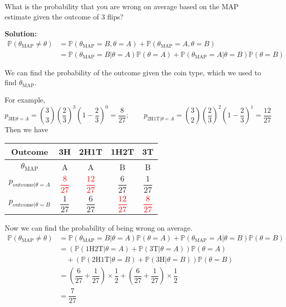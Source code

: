 \newpage
\begin{eg}
  What is the probability that you are wrong on average based on the MAP estimate given the outcome of 3 flips? 

  \textbf{Solution:} 
  \[
    \begin{aligned}
      \mathbb{P}(\theta_{\text{MAP}} \neq \theta) &= \mathbb{P}(\theta_{\text{MAP}} = B, \theta = A) + \mathbb{P}(\theta_{\text{MAP}} = A, \theta = B) \\
      &= \mathbb{P}(\theta_{\text{MAP}} = B \vert \theta = A) \mathbb{P}(\theta = A) + \mathbb{P}(\theta_{\text{MAP}} = A \vert \theta = B) \mathbb{P}(\theta = B)
    \end{aligned}
  \]

  We can find the probability of the outcome given the coin type, which we used to find \(\theta_{\text{MAP}}\). 

  For example,
  \[
    p_{\text{3H} \vert \theta = A} = \binom{3}{3} (\frac{2}{3})^3 (1 - \frac{2}{3})^0 = \frac{8}{27}; \quad\quad p_{\text{2H1T} \vert \theta = A} = \binom{3}{2} (\frac{2}{3})^2 (1 - \frac{2}{3})^1 = \frac{12}{27}
  \]
  Then we have 
  \begin{table}[H]
    \centering
    \begin{tabular}{c|c|c|c|c}
        \toprule
        Outcome & 3H & 2H1T & 1H2T & 3T  \\
      \midrule
        \(\theta_{\text{MAP}}\) & A & A & B & B  \\[5pt]
        \(p_{\text{outcome} \vert \theta = A}\) & \textcolor{red}{\(\dfrac{8}{27}\)} & \textcolor{red}{\(\dfrac{12}{27}\)} & \(\dfrac{6}{27}\) & \(\dfrac{1}{27}\)  \\[8pt]
        \(p_{\text{outcome} \vert \theta = B}\) & \(\dfrac{1}{27}\) & \(\dfrac{6}{27}\) & \textcolor{red}{\(\dfrac{12}{27}\)} & \textcolor{red}{\(\dfrac{8}{27}\)}  \\
        \bottomrule
    \end{tabular}
  \end{table}
  Now we can find the probability of being wrong on average. 
  \[
    \begin{aligned}
      \mathbb{P}(\theta_{\text{MAP}} \neq \theta) &= \mathbb{P}(\theta_{\text{MAP}} = B \vert \theta = A) \mathbb{P}(\theta = A) + \mathbb{P}(\theta_{\text{MAP}} = A \vert \theta = B) \mathbb{P}(\theta = B) \\
      &= (\mathbb{P}(\text{1H2T} \vert \theta = A) + \mathbb{P}(\text{3T} \vert \theta = A)) \mathbb{P}(\theta = A) \\
      &\quad + (\mathbb{P}(\text{2H1T} \vert \theta = B) + \mathbb{P}(\text{3H} \vert \theta = B)) \mathbb{P}(\theta = B) \\ 
      &= \left(\dfrac{6}{27} + \dfrac{1}{27}\right) \times \dfrac{1}{2} + \left(\dfrac{6}{27} + \dfrac{1}{27}\right) \times \dfrac{1}{2} \\
      &= \dfrac{7}{27}
    \end{aligned}
  \]
\end{eg}

